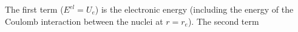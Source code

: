 The first term ($E^{el}=U_e$) is the electronic energy (including the energy of the Coulomb interaction between the nuclei at $r=r_e$). The second term
